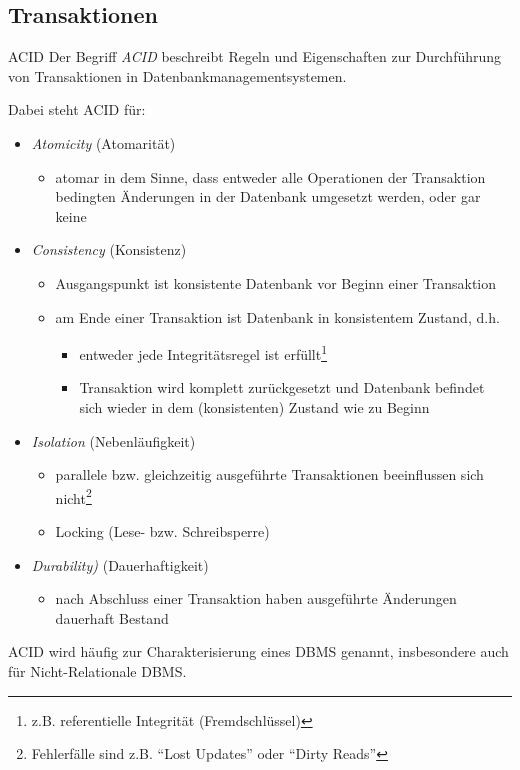 \subsection{Transaktionen}

\begin{defi}{ACID}
    Der Begriff \emph{ACID} beschreibt Regeln und Eigenschaften zur Durchführung von Transaktionen in Datenbankmanagementsystemen.

    Dabei steht ACID für:
    \begin{itemize}
        \item \emph{Atomicity} (Atomarität)
              \begin{itemize}
                  \item atomar in dem Sinne, dass entweder alle Operationen der Transaktion bedingten Änderungen in der Datenbank umgesetzt werden, oder gar keine
              \end{itemize}
        \item \emph{Consistency} (Konsistenz)
              \begin{itemize}
                  \item Ausgangspunkt ist konsistente Datenbank vor Beginn einer Transaktion
                  \item am Ende einer Transaktion ist Datenbank in konsistentem Zustand, d.h.
                        \begin{itemize}
                            \item entweder jede Integritätsregel ist erfüllt\footnote{z.B. referentielle Integrität (Fremdschlüssel)}
                            \item Transaktion wird komplett zurückgesetzt und Datenbank befindet sich wieder in dem (konsistenten) Zustand wie zu Beginn
                        \end{itemize}
              \end{itemize}
        \item \emph{Isolation} (Nebenläufigkeit)
              \begin{itemize}
                  \item parallele bzw. gleichzeitig ausgeführte Transaktionen beeinflussen sich nicht\footnote{Fehlerfälle sind z.B. \enquote{Lost Updates} oder \enquote{Dirty Reads}}
                  \item Locking (Lese- bzw. Schreibsperre)
              \end{itemize}
        \item \emph{Durability)} (Dauerhaftigkeit)
              \begin{itemize}
                  \item nach Abschluss einer Transaktion haben ausgeführte Änderungen dauerhaft Bestand
              \end{itemize}
    \end{itemize}

    ACID wird häufig zur Charakterisierung eines DBMS genannt, insbesondere auch für Nicht-Relationale DBMS.
\end{defi}

